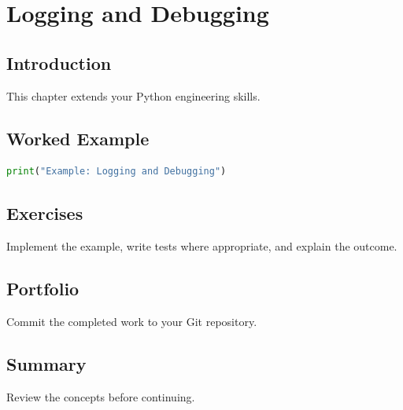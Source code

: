 \chapter{Logging and Debugging}
\label{chap:vol3-24}



\section{Introduction}
This chapter extends your Python engineering skills.

\section{Worked Example}
\begin{lstlisting}[language=Python]
print("Example: Logging and Debugging")
\end{lstlisting}

\section{Exercises}
\begin{exercise}
Implement the example, write tests where appropriate, and explain the outcome.
\end{exercise}

\section{Portfolio}
Commit the completed work to your Git repository.

\section{Summary}
Review the concepts before continuing.
